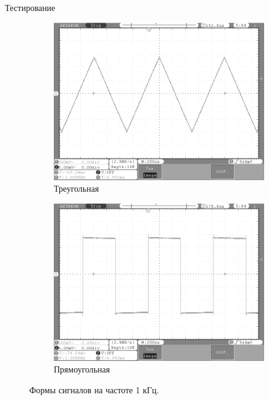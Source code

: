 \documentclass[10pt]{beamer}
\begin{document}
\begin{frame}{Тестирование}
\begin{figure}
\begin{subfigure}[H]{0.4\textwidth}
         \includegraphics[width=\textwidth]{triangle1}
         \caption*{Треугольная}
     \end{subfigure}
     \hfill
     \begin{subfigure}[H]{0.4\textwidth}
         \centering
         \includegraphics[width=\textwidth]{square1}
         \caption*{Прямоугольная}
     \end{subfigure}
        \caption*{Формы сигналов на частоте 1 кГц.}
\end{figure}
\end{frame}
\end{document}
